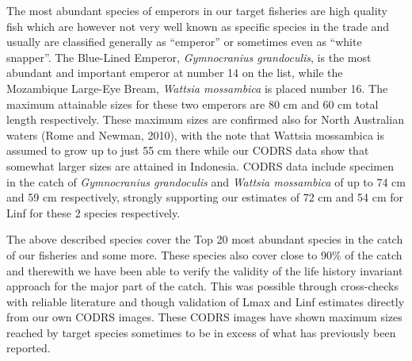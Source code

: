 The most abundant species of emperors in our target fisheries are high quality fish which are however not very well known as specific species in the trade and usually are classified generally as ``emperor'' or sometimes even as ``white snapper''. The Blue-Lined Emperor, \textit{Gymnocranius grandoculis}, is the most abundant and important emperor at number 14 on the list, while the Mozambique Large-Eye Bream, \textit{Wattsia mossambica} is placed number 16. The maximum attainable sizes for these two emperors are 80 cm and 60 cm total length respectively. These maximum sizes are confirmed also for North Australian waters (Rome and Newman, 2010), with the note that Wattsia mossambica is assumed to grow up to just 55 cm there while our CODRS data show that somewhat larger sizes are attained in Indonesia. CODRS data include specimen in the catch of \textit{Gymnocranius grandoculis} and \textit{Wattsia mossambica} of up to 74 cm and 59 cm respectively, strongly supporting our estimates of 72 cm and 54 cm for Linf for these 2 species respectively.

The above described species cover the Top 20 most abundant species in the catch of our fisheries and some more. These species also cover close to 90\% of the catch and therewith we have been able to verify the validity of the life history invariant approach for the major part of the catch. This was possible through cross-checks with reliable literature and though validation of Lmax and Linf estimates directly from our own CODRS images. These CODRS images have shown maximum sizes reached by target species sometimes to be in excess of what has previously been reported.
